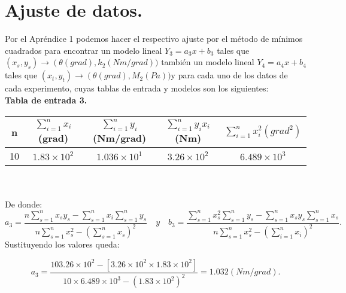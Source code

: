 \documentclass[10pt,a4paper]{article}
\begin{document}
\section*{Ajuste de datos.}
Por el Apr\'{e}ndice 1 podemos hacer el respectivo ajuste por el m\'{e}todo de m\'{i}nimos cuadrados para encontrar un modelo lineal ${Y}_{3}={a}_{3}x +{b}_{3}$ tales que $\left( { x }_{ s },{ y }_{ s } \right) \rightarrow \left( \theta(grad),{k}_{2} (Nm/grad))$  tambi\'{e}n un modelo lineal ${Y}_{4}={a}_{4}x +{b}_{4}$ tales que $\left( { x }_{ t },{ y }_{ t } \right) \rightarrow \left( \theta(grad), {M}_{2}(Pa))$y para cada uno de los datos de cada experimento, cuyas tablas de entrada y modelos son los siguientes:
\medskip
\\
\textbf{Tabla de entrada 3.}
\\
\begin{figure 6}
\centering
\begin{tabular}{|c|c|c|c|c|}
\hline 
n&$\sum _{ i=1 }^{ n }{ { x }_{ i } } $(grad) & $\sum _{ i=1 }^{ n }{ { y }_{ i } }$(Nm/grad) & $ \sum _{ i=1 }^{ n }{ { y }_{ i } } { x }_{ i }$ (Nm) & $\sum _{ i=1 }^{ n }{ { x }_{ i }^{ 2 } }({ grad }^{ 2 })$ \\ 

\hline 
10&$1.83\times { 10 }^{ 2 }$& $1.036\times { 10 }^{ 1 }$ & $3.26\times { 10 }^{ 2 }$ & $6.489\times { 10 }^{ 3 }$\\ 
\hline 
\end{tabular}
\end{figure 6} 
\\
\\
De donde:
\[{a}_{3}=\frac { n\sum _{s=1 }^{ n }{ { x }_{ s }{ y }_{ s } } -\sum _{ s=1 }^{ n }{ { x }_{ i } } \sum _{ s=1 }^{ n }{ { y }_{ s } }  }{ n\sum _{ s=1 }^{ n }{ { x }_{ s }^{ 2 } } -{ \left( \sum _{ s=1 }^{ n }{ { x }_{ s } }  \right)  }^{ 2 } } \quad y\quad {b}_{3}=\frac { \sum _{ s=1 }^{ n }{ { x }_{ s }^{ 2 } } \sum _{ s=1 }^{ n }{ { y }_{ s } } -\sum _{ s=1 }^{ n }{ { x }_{ s }{ y }_{ s } } \sum _{ s=1 }^{ n }{ { x }_{ s } }  }{ n\sum _{ s=1 }^{ n }{ { x }_{ s }^{ 2 } } -{ \left( \sum _{ i=1 }^{ n }{ { x }_{ i } }  \right)  }^{ 2 } }.\]
Sustituyendo los valores queda:

\[{a}_{3}=\frac { 103.26\times { 10 }^{ 2 }-\left[3.26\times { 10 }^{ 2 }\times 1.83\times { 10 }^{ 2 }  \right]  }{ 10\times 6.489\times { 10 }^{ 3 }-{ \left( 1.83\times { 10 }^{ 2 }\right)  }^{ 2 } } =1.032(Nm/grad).\]
\end{document}
